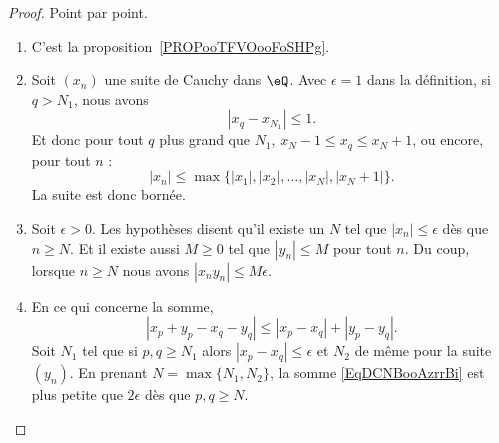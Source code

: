 \begin{proof}
    Point par point.
    \begin{enumerate}
        \item
            C'est la proposition~\ref{PROPooTFVOooFoSHPg}.
        \item
            Soit \( (x_n)\) une suite de Cauchy dans \( \eQ\). Avec \( \epsilon=1\) dans la définition, si \( q>N_1\), nous avons
            \begin{equation}
                | x_q-x_{N_1} |\leq 1.
            \end{equation}
            Et donc pour tout \( q\) plus grand que \( N_1\), \( x_N-1\leq x_q\leq x_N+1\), ou encore, pour tout \( n\) :
            \begin{equation}
                | x_n |\leq\max\{ | x_1 |,| x_2 |,\ldots,| x_N |,| x_N+1 | \}.
            \end{equation}
            La suite est donc bornée.
        \item
            Soit \(\epsilon>0\). Les hypothèses disent qu'il existe un \( N\) tel que \( | x_n |\leq \epsilon\) dès que \( n\geq N\). Et il existe aussi \( M\geq 0\) tel que \( | y_n |\leq M\) pour tout \( n\). Du coup, lorsque \( n\geq N\) nous avons \( | x_ny_n |\leq M\epsilon\).
        \item
            En ce qui concerne la somme,
            \begin{equation}        \label{EqDCNBooAzrrBi}
                | x_p+y_p-x_q-y_q |\leq | x_p-x_q |+| y_p-y_q |.
            \end{equation}
            Soit \( N_1\) tel que si \( p,q\geq N_1\) alors \( | x_p-x_q |\leq \epsilon\) et \( N_2\) de même pour la suite \( (y_n)\). En prenant \( N=\max\{ N_1,N_2 \}\), la somme \eqref{EqDCNBooAzrrBi} est plus petite que \( 2\epsilon\) dès que \( p,q\geq N\).


\end{enumerate}
\end{proof}

